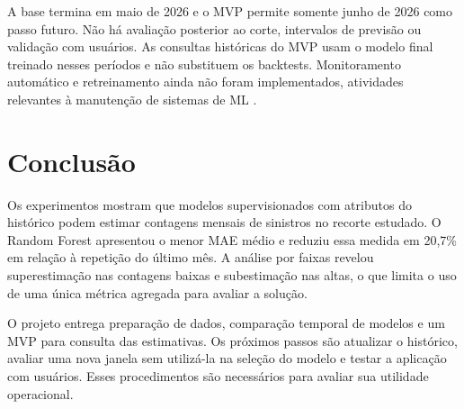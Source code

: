 \documentclass[12pt]{article}
\begin{document}
A base termina em maio de 2026 e o MVP permite somente junho de 2026 como passo futuro. Não há avaliação posterior ao corte, intervalos de previsão ou validação com usuários. As consultas históricas do MVP usam o modelo final treinado nesses períodos e não substituem os backtests. Monitoramento automático e retreinamento ainda não foram implementados, atividades relevantes à manutenção de sistemas de ML \cite{sculley2015debt}.

\section{Conclusão}

Os experimentos mostram que modelos supervisionados com atributos do histórico podem estimar contagens mensais de sinistros no recorte estudado. O Random Forest apresentou o menor MAE médio e reduziu essa medida em 20,7\% em relação à repetição do último mês. A análise por faixas revelou superestimação nas contagens baixas e subestimação nas altas, o que limita o uso de uma única métrica agregada para avaliar a solução.

O projeto entrega preparação de dados, comparação temporal de modelos e um MVP para consulta das estimativas. Os próximos passos são atualizar o histórico, avaliar uma nova janela sem utilizá-la na seleção do modelo e testar a aplicação com usuários. Esses procedimentos são necessários para avaliar sua utilidade operacional.



\end{document}
